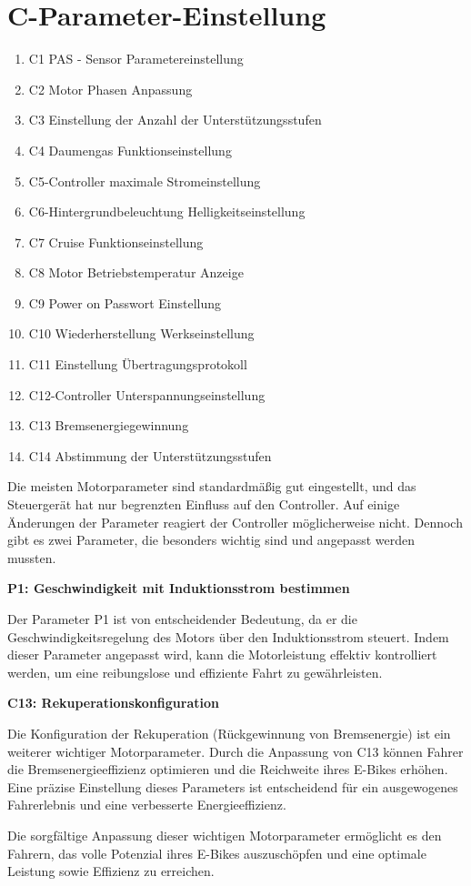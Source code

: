 \section{C-Parameter-Einstellung}
\begin{enumerate}[label=\arabic*.]
    \item C1 PAS - Sensor Parametereinstellung
    \item C2 Motor Phasen Anpassung
    \item C3 Einstellung der Anzahl der Unterstützungsstufen
    \item C4 Daumengas Funktionseinstellung
    \item C5-Controller maximale Stromeinstellung
    \item C6-Hintergrundbeleuchtung Helligkeitseinstellung
    \item C7 Cruise Funktionseinstellung
    \item C8 Motor Betriebstemperatur Anzeige
    \item C9 Power on Passwort Einstellung
    \item C10 Wiederherstellung Werkseinstellung
    \item C11 Einstellung Übertragungsprotokoll
    \item C12-Controller Unterspannungseinstellung
    \item C13 Bremsenergiegewinnung
    \item C14 Abstimmung der Unterstützungsstufen
\end{enumerate}

Die meisten Motorparameter sind standardmäßig gut eingestellt, und das Steuergerät hat nur begrenzten Einfluss auf den Controller. Auf einige Änderungen der Parameter reagiert der Controller möglicherweise nicht. Dennoch gibt es zwei Parameter, die besonders wichtig sind und angepasst werden mussten.

\textbf{P1: Geschwindigkeit mit Induktionsstrom bestimmen}

Der Parameter P1 ist von entscheidender Bedeutung, da er die Geschwindigkeitsregelung des Motors über den Induktionsstrom steuert. Indem dieser Parameter angepasst wird, kann die Motorleistung effektiv kontrolliert werden, um eine reibungslose und effiziente Fahrt zu gewährleisten.

\textbf{C13: Rekuperationskonfiguration}

Die Konfiguration der Rekuperation (Rückgewinnung von Bremsenergie) ist ein weiterer wichtiger Motorparameter. Durch die Anpassung von C13 können Fahrer die Bremsenergieeffizienz optimieren und die Reichweite ihres E-Bikes erhöhen. Eine präzise Einstellung dieses Parameters ist entscheidend für ein ausgewogenes Fahrerlebnis und eine verbesserte Energieeffizienz.

Die sorgfältige Anpassung dieser wichtigen Motorparameter ermöglicht es den Fahrern, das volle Potenzial ihres E-Bikes auszuschöpfen und eine optimale Leistung sowie Effizienz zu erreichen.






